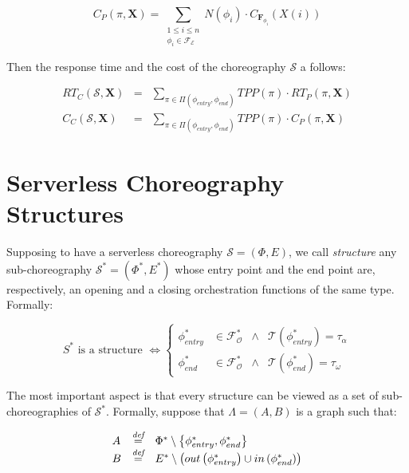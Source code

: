 \begin{equation}
	C_P(\pi, \textbf{X}) = \sum_{\substack{1\le i\le n\\ \phi_i \in \mathscr{F_E}}} N(\phi_i) \cdot C_{\textbf{F}_{\phi_i}} (X(i))
\end{equation}


Then the response time and the cost of the choreography $\mathcal{S}$ a follows:

\begin{eqnarray}
	RT_C(\mathcal{S}, \textbf{X}) & = & \sum_{\pi \in \Pi(\phi_{entry}, \phi_{end})} TPP(\pi) \cdot RT_{P}(\pi, \textbf{X}) \\
	C_C(\mathcal{S}, \textbf{X}) & = & \sum_{\pi \in \Pi(\phi_{entry}, \phi_{end})} TPP(\pi) \cdot C_{P}(\pi, \textbf{X}) 
\end{eqnarray}



\section{Serverless Choreography Structures}

Supposing to have a serverless choreography $\mathcal{S} = (\Phi,E)$, we call \textit{structure} any sub-choreography $\mathcal{S}^*= (\Phi^*,E^*)$ whose entry point and the end point are, respectively, an opening and a closing orchestration functions of the same type. Formally:

\begin{equation}
	S^* \text{ is a structure } \Leftrightarrow \left\{ \begin{array}{rlll}
		\phi_{entry}^* & \in \mathscr{F_O^*} & \wedge & \mathscr{T}(\phi_{entry}^*) = \tau_{\alpha} \\ 
		\phi_{end}^* & \in \mathscr{F_O^*} & \wedge & \mathscr{T}(\phi_{end}^*) = \tau_{\omega}
	\end{array} \right.
\end{equation}

The most important aspect is that every structure can be viewed as a set of sub-choreographies of $\mathcal{S}^*$. Formally, suppose that $\Lambda = (A,B)$ is a graph such that:

\begin{equation}
\begin{array}{lll}
	A & \overset{\textit{def}}{=} & \Phi^* \setminus \left\lbrace \phi_{entry}^*,\phi_{end}^* \right\rbrace   \\
	B & \overset{\textit{def}}{=} & E^* \setminus \left( out\left(\phi_{entry}^*\right) \cup in\left(\phi_{end}^*\right) \right)
\end{array}
\end{equation}


